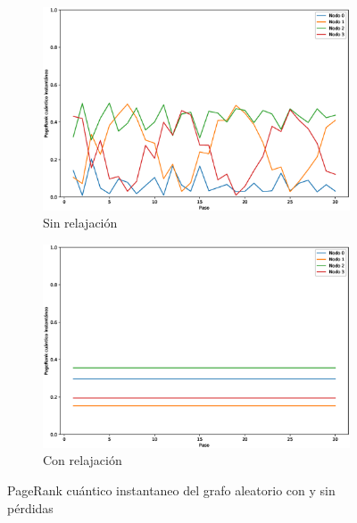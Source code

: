 \begin{figure}[H]
    \centering
    \begin{subfigure}[m]{0.45\textwidth}
        \centering
        \includegraphics[width=0.9\linewidth]{img/any-inst-lossless.eps}
        \caption{Sin relajación}
    \end{subfigure}
    \begin{subfigure}[m]{0.45\textwidth}
        \centering
        \includegraphics[width=0.9\linewidth]{img/any-inst-lossy.eps}
        \caption{Con relajación}
    \end{subfigure}
    \caption[PageRank cuántico instantaneo del grafo aleatorio con y sin pérdidas]{PageRank cuántico instantaneo del grafo aleatorio con y sin pérdidas}
    \label{fig:instanylossy}
\end{figure}

